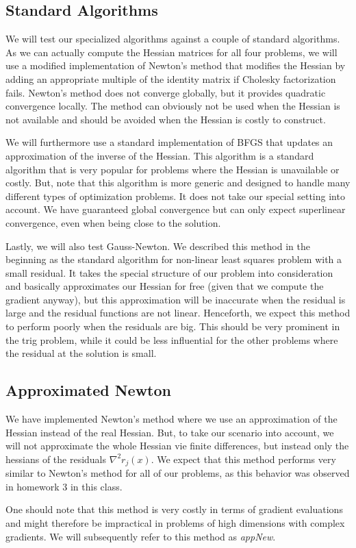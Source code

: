 \documentclass{article}
\theoremstyle{plain}%
\theoremstyle{definition}
\begin{document}
\subsection{Standard Algorithms}
We will test our specialized algorithms against a couple of standard algorithms. As we
can actually compute the Hessian matrices for all four problems, we will use a modified
implementation of Newton's method that modifies the Hessian by adding an appropriate multiple of the identity matrix if
Cholesky factorization fails. Newton's method does not converge
globally, but it provides quadratic convergence locally. The method can obviously
not be used when the Hessian is not available and should be avoided when the Hessian is
costly to construct.\par
We will furthermore use a standard implementation of
BFGS that updates an approximation of the inverse of the Hessian. This algorithm is
a standard algorithm that is very popular for problems where the Hessian is unavailable
or costly. But, note that this algorithm is more generic and designed to handle many different types of optimization
problems. It does not take our special setting into account.  We have guaranteed global convergence but can only expect superlinear
convergence, even when being close to the solution.\par
Lastly, we will also test Gauss-Newton. We described this method in the beginning as
the standard algorithm for non-linear least squares problem with a small residual.
It takes the special structure of our problem into consideration and basically
approximates our Hessian for free (given that we compute the gradient anyway),
but this approximation will be inaccurate when the residual is large and 
the residual functions are not linear. Henceforth, we  expect this method to
perform poorly when the residuals are big. This should be very prominent in the trig problem,
while it could be less influential for the other problems where the residual at the solution
is small. 
\subsection{Approximated Newton}
We have implemented Newton's method where we use an approximation of the Hessian
instead of the real Hessian. But, to take our scenario into account, we will not approximate
the whole Hessian vie finite differences, but instead only the hessians of the residuals $
  \nabla^2 r_j(x)$.
We expect that this method performs very similar to Newton's method for all of our
problems, as this behavior was observed in homework 3 in this class. \par
One should note that this method is very costly in terms of gradient evaluations
and might therefore be impractical in problems of high dimensions with complex
gradients. We will subsequently refer to this method as \emph{appNew}.
\end{document}
